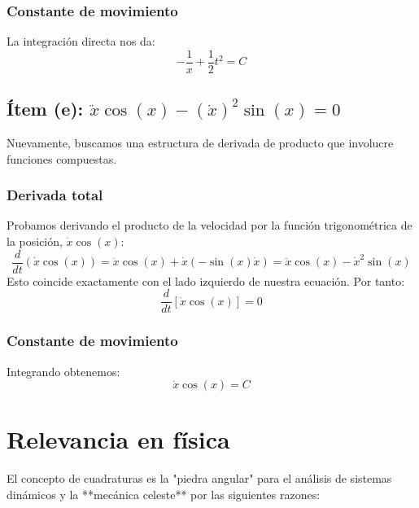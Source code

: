 \documentclass[a4paper]{article}
\begin{document}
\subsubsection{Constante de movimiento}
La integración directa nos da:
$$ -\frac{1}{x} + \frac{1}{2}t^2 = C $$

\subsection{Ítem (e): $\ddot{x} \cos(x) - (\dot{x})^2 \sin(x) = 0$}

Nuevamente, buscamos una estructura de derivada de producto que involucre funciones compuestas.

\subsubsection{Derivada total}
Probamos derivando el producto de la velocidad por la función trigonométrica de la posición, $\dot{x} \cos(x)$:
$$ \frac{d}{dt} (\dot{x} \cos(x)) = \ddot{x} \cos(x) + \dot{x} (-\sin(x) \dot{x}) = \ddot{x} \cos(x) - \dot{x}^2 \sin(x) $$
Esto coincide exactamente con el lado izquierdo de nuestra ecuación. Por tanto:
$$ \frac{d}{dt} [\dot{x} \cos(x)] = 0 $$

\subsubsection{Constante de movimiento}
Integrando obtenemos:
$$ \dot{x} \cos(x) = C $$

\section*{Relevancia en física}

El concepto de cuadraturas es la "piedra angular" para el análisis de sistemas dinámicos y la **mecánica celeste** por las siguientes razones:
\end{document}
